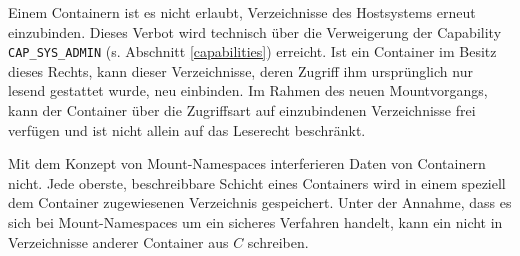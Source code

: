 \documentclass[../main.tex]{subfiles}
\begin{document}

			Einem Containern ist es nicht erlaubt, Verzeichnisse des Hostsystems erneut einzubinden. Dieses Verbot wird technisch über die Verweigerung der Capability \texttt{CAP\_SYS\_ADMIN} (s. Abschnitt \ref{capabilities}) erreicht. Ist ein Container im Besitz dieses Rechts, kann dieser Verzeichnisse, deren Zugriff ihm ursprünglich nur lesend gestattet wurde, neu einbinden. Im Rahmen des neuen Mountvorgangs, kann der Container über die Zugriffsart auf einzubindenen Verzeichnisse frei verfügen und ist nicht allein auf das Leserecht beschränkt.



			Mit dem Konzept von Mount-Namespaces interferieren Daten von Containern nicht. Jede oberste, beschreibbare Schicht eines Containers wird in einem speziell dem Container zugewiesenen Verzeichnis gespeichert. Unter der Annahme, dass es sich bei Mount-Namespaces um ein sicheres Verfahren handelt, kann ein \cbroken{} nicht in Verzeichnisse anderer Container aus \(C\) schreiben.




\end{document}
